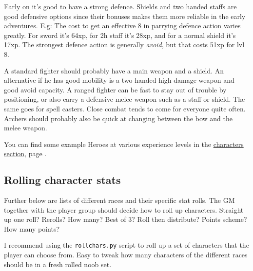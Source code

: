 Early on it's good to have a strong defence. Shields and two handed staffs are good defensive options since their bonuses makes them more reliable in the early adventures. E.g: The cost to get an effective 8 in parrying defence action varies greatly. For sword it's 64xp, for 2h staff it's 28xp, and for a normal shield it's 17xp. The strongest defence action is generally \emph{avoid}, but that costs 51xp for lvl 8.

A standard fighter should probably have a main weapon and a shield. An alternative if he has good mobility is a two handed high damage weapon and good avoid capacity. A ranged fighter can be fast to stay out of trouble by positioning, or also carry a defensive melee weapon such as a staff or shield. The same goes for spell casters. Close combat tends to come for everyone quite often. Archers should probably also be quick at changing between the bow and the melee weapon.

You can find some example Heroes at various experience levels in the \hyperref[cpt:characters]{characters section}, page \pageref{cpt:characters}.


\subsection*{Rolling character stats}
Further below are lists of different races and their specific stat rolls. The GM together with the player group should decide how to roll up characters. Straight up one roll? Rerolls? How many? Best of 3? Roll then distribute? Points scheme? How many points?

I recommend using the \verb|rollchars.py| script to roll up a set of characters that the player can choose from. Easy to tweak how many characters of the different races should be in a fresh rolled noob set.



